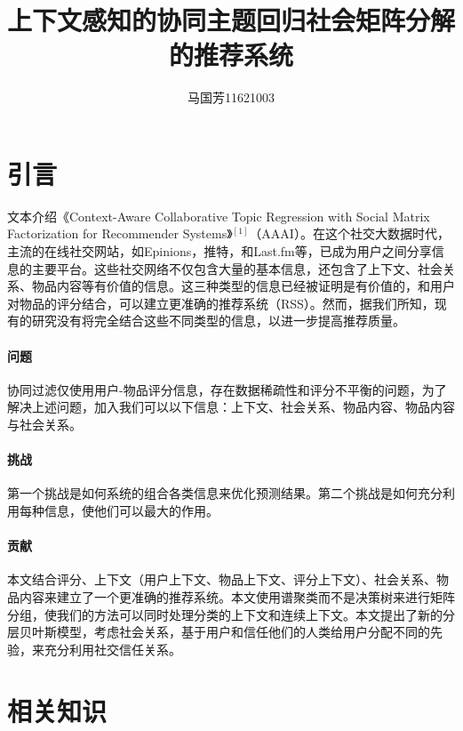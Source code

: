 \documentclass[10pt,a4paper]{article}
\theoremstyle{mythm}%
\numberwithin{equation}{section}
\begin{document}
\setlength{\abovedisplayskip}{1ex} %
\setlength{\belowdisplayskip}{1ex} %

\author{马国芳11621003}                                 %
\title{上下文感知的协同主题回归社会矩阵分解的推荐系统}              %
\maketitle                                           %

\section{引言}
文本介绍《Context-Aware Collaborative Topic Regression with Social Matrix Factorization for Recommender Systems》$^{[1]}$（AAAI）。在这个社交大数据时代，主流的在线社交网站，如Epinions，推特，和Last.fm等，已成为用户之间分享信息的主要平台。这些社交网络不仅包含大量的基本信息，还包含了上下文、社会关系、物品内容等有价值的信息。这三种类型的信息已经被证明是有价值的，和用户对物品的评分结合，可以建立更准确的推荐系统（RSS）。然而，据我们所知，现有的研究没有将完全结合这些不同类型的信息，以进一步提高推荐质量。
\paragraph{问题}协同过滤仅使用用户-物品评分信息，存在数据稀疏性和评分不平衡的问题，为了解决上述问题，加入我们可以以下信息：上下文、社会关系、物品内容、物品内容与社会关系。
 \paragraph{挑战}第一个挑战是如何系统的组合各类信息来优化预测结果。第二个挑战是如何充分利用每种信息，使他们可以最大的作用。
 \paragraph{贡献}本文结合评分、上下文（用户上下文、物品上下文、评分上下文）、社会关系、物品内容来建立了一个更准确的推荐系统。本文使用谱聚类而不是决策树来进行矩阵分组，使我们的方法可以同时处理分类的上下文和连续上下文。本文提出了新的分层贝叶斯模型，考虑社会关系，基于用户和信任他们的人类给用户分配不同的先验，来充分利用社交信任关系。

\section{相关知识}
\end{document}
